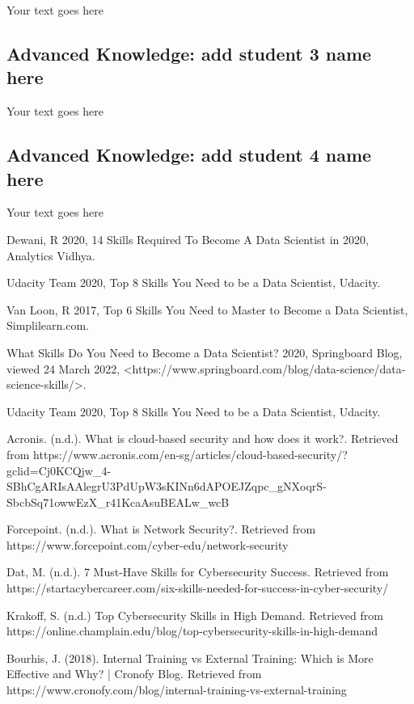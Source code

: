 \documentclass[a4paper, 11pt]{report}
\begin{document}
Your text goes here

\subsection{Advanced Knowledge: add student 3 name here}

Your text goes here

\subsection{Advanced Knowledge: add student 4 name here}

Your text goes here




\newpage




Dewani, R 2020, 14 Skills Required To Become A Data Scientist in 2020, Analytics Vidhya.

Udacity Team 2020, Top 8 Skills You Need to be a Data Scientist, Udacity.

Van Loon, R 2017, Top 6 Skills You Need to Master to Become a Data Scientist, Simplilearn.com.

What Skills Do You Need to Become a Data Scientist? 2020, Springboard Blog, viewed 24 March 2022, <https://www.springboard.com/blog/data-science/data-science-skills/>.

Udacity Team 2020, Top 8 Skills You Need to be a Data Scientist, Udacity.

Acronis. (n.d.). What is cloud-based security and how does it work?. Retrieved from https://www.acronis.com/en-sg/articles/cloud-based-security/?gclid=Cj0KCQjw_4-SBhCgARIsAAlegrU3PdUpW3sKINn6dAPOEJZqpc_gNXoqrS-SbcbSq71owwEzX_r41KcaAsuBEALw_wcB

Forcepoint. (n.d.). What is Network Security?. Retrieved from https://www.forcepoint.com/cyber-edu/network-security

Dat, M. (n.d.). 7 Must-Have Skills for Cybersecurity Success. Retrieved from https://startacybercareer.com/six-skills-needed-for-success-in-cyber-security/

Krakoff, S. (n.d.) Top Cybersecurity Skills in High Demand. Retrieved from https://online.champlain.edu/blog/top-cybersecurity-skills-in-high-demand

Bourhis, J. (2018). Internal Training vs External Training: Which is More Effective and Why? | Cronofy Blog. Retrieved from https://www.cronofy.com/blog/internal-training-vs-external-training
\end{document}
